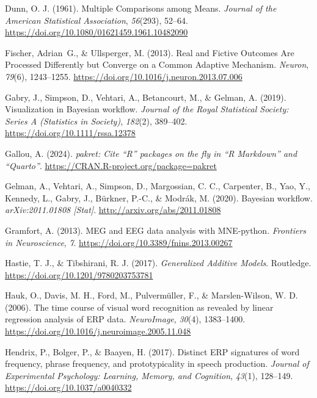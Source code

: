 \documentclass[
  man,
  floatsintext,
  longtable,
  a4paper,
  nolmodern,
  notxfonts,
  notimes,
  colorlinks=true,linkcolor=blue,citecolor=blue,urlcolor=blue]{apa7}
\newlength{\cslhangindent}
\newenvironment{CSLReferences}[2] %
 {\begin{list}{}{%
  \setlength{\itemindent}{0pt}
  \setlength{\leftmargin}{0pt}
  \setlength{\parsep}{0pt}
  \ifodd #1
   \setlength{\leftmargin}{\cslhangindent}
   \setlength{\itemindent}{-1\cslhangindent}
  \fi
  \setlength{\itemsep}{#2\baselineskip}}}
 {\end{list}}
\begin{document}
\begin{CSLReferences}{1}{0}
Dunn, O. J. (1961). Multiple Comparisons among Means. \emph{Journal of
the American Statistical Association}, \emph{56}(293), 52--64.
\url{https://doi.org/10.1080/01621459.1961.10482090}

Fischer, Adrian~G., \& Ullsperger, M. (2013). Real and Fictive Outcomes
Are Processed Differently but Converge on a Common Adaptive Mechanism.
\emph{Neuron}, \emph{79}(6), 1243--1255.
\url{https://doi.org/10.1016/j.neuron.2013.07.006}

Gabry, J., Simpson, D., Vehtari, A., Betancourt, M., \& Gelman, A.
(2019). Visualization in Bayesian work{fl}ow. \emph{Journal of the Royal
Statistical Society: Series A (Statistics in Society)}, \emph{182}(2),
389--402. \url{https://doi.org/10.1111/rssa.12378}

Gallou, A. (2024). \emph{{pakret}: Cite {``{R}''} packages on the fly in
{``{R Markdown}''} and {``{Quarto}''}}.
\url{https://CRAN.R-project.org/package=pakret}

Gelman, A., Vehtari, A., Simpson, D., Margossian, C. C., Carpenter, B.,
Yao, Y., Kennedy, L., Gabry, J., Bürkner, P.-C., \& Modrák, M. (2020).
Bayesian workflow. \emph{arXiv:2011.01808 {[}Stat{]}}.
\url{http://arxiv.org/abs/2011.01808}

Gramfort, A. (2013). MEG and EEG data analysis with MNE-python.
\emph{Frontiers in Neuroscience}, \emph{7}.
\url{https://doi.org/10.3389/fnins.2013.00267}

Hastie, T. J., \& Tibshirani, R. J. (2017). \emph{Generalized Additive
Models}. Routledge. \url{https://doi.org/10.1201/9780203753781}

Hauk, O., Davis, M. H., Ford, M., Pulvermüller, F., \& Marslen-Wilson,
W. D. (2006). The time course of visual word recognition as revealed by
linear regression analysis of ERP data. \emph{NeuroImage}, \emph{30}(4),
1383--1400. \url{https://doi.org/10.1016/j.neuroimage.2005.11.048}

Hendrix, P., Bolger, P., \& Baayen, H. (2017). Distinct ERP signatures
of word frequency, phrase frequency, and prototypicality in speech
production. \emph{Journal of Experimental Psychology: Learning, Memory,
and Cognition}, \emph{43}(1), 128--149.
\url{https://doi.org/10.1037/a0040332}


\end{CSLReferences}
\end{document}
